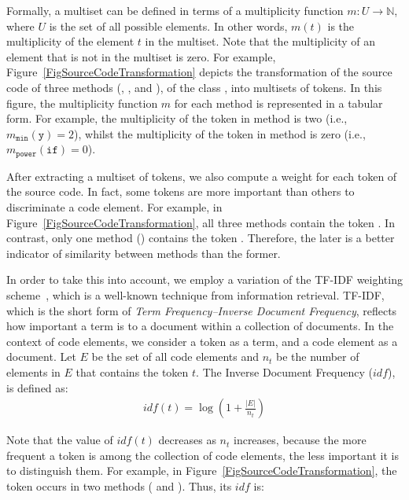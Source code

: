 Formally, a multiset can be defined in terms of a multiplicity function $m: U \to \mathbb{N}$, where $U$ is the set of all possible elements. In other words, $m(t)$ is the multiplicity of the element $t$ in the multiset. Note that the multiplicity of an element that is not in the multiset is zero.
For example, Figure~\ref{FigSourceCodeTransformation} depicts the transformation of the source code of three methods (, , and ), of the class , into multisets of tokens. In this figure, the multiplicity function $m$ for each method is represented in a tabular form. For example, the multiplicity of the token  in method  is two (i.e., $m_{\mathtt{min}}(\mathtt{y}) = 2$), whilst the multiplicity of the token  in method  is zero (i.e., $m_{\mathtt{power}}(\mathtt{if}) = 0$).

After extracting a multiset of tokens, we also compute a weight for each token
of the source code.
In fact, some tokens are more important than others to discriminate a code element.
For example, in Figure~\ref{FigSourceCodeTransformation}, all three methods contain the token . In contrast, only one method () contains the token . Therefore, the later is a better indicator of similarity between methods than the former.

In order to take this into account, we employ a variation of the TF-IDF weighting scheme~\cite{salton1986introduction}, which is a well-known technique from information retrieval.
TF-IDF, which is the short form of \emph{Term Frequency–Inverse Document Frequency}, reflects how important a term is to a document within a collection of documents.
In the context of code elements, we consider a token as a term, and a code element as a document.
Let $E$ be the set of all code elements and $n_t$ be the number of elements in $E$ that contains the token $t$. The Inverse Document Frequency ($\mathit{idf}$), is defined as:
\begin{align}
\mathit{idf}(t) = \log (1 + \frac{|E|}{n_t})
\end{align}

Note that the value of $\mathit{idf}(t)$ decreases as $n_t$ increases, because the more frequent a token is among the collection of code elements, the less important it is to distinguish them.
For example, in Figure~\ref{FigSourceCodeTransformation}, the token  occurs in two methods ( and ). Thus, its $\mathit{idf}$ is:

